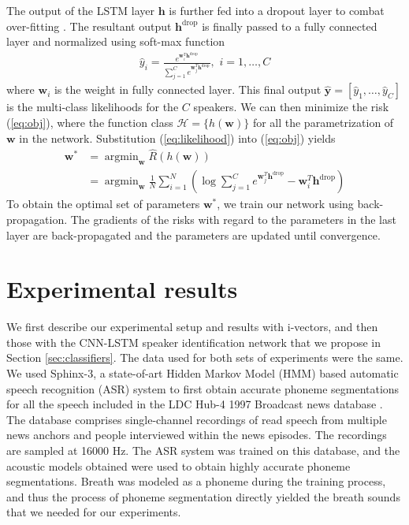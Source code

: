 \documentclass[a4paper]{article}
\DeclareMathOperator*{\argmin}{argmin}
\begin{document}
The output of the LSTM layer $\mathbf{h}$ is further fed into a dropout layer to combat over-fitting \cite{srivastava2014dropout}. The resultant output $\mathbf{h}^{\mathrm{drop}}$ is finally passed to a fully connected layer and normalized using soft-max function
\begin{align}
\widehat{y}_i = \frac{e^{\mathbf{w}_i^T \mathbf{h}^{\mathrm{drop}}}}{\sum_{j=1}^{C}e^{\mathbf{w}_j^T \mathbf{h}^{\mathrm{drop}}}},\,\, i = 1,\ldots,C
\label{eq:likelihood}
\end{align}
where $\mathbf{w}_i$ is the weight in fully connected layer. This final output $\widehat{\mathbf{y}} = \left [\widehat{y}_1, \ldots, \widehat{y}_C \right]$ is the multi-class likelihoods for the $C$ speakers. We can then minimize the risk (\ref{eq:obj}), where the function class $\mathcal{H} = \{h(\mathbf{w})\}$ for all the parametrization of $\mathbf{w}$ in the network. Substitution (\ref{eq:likelihood}) into (\ref{eq:obj}) yields
\begin{align}
\mathbf{w}^* &= \argmin_{\mathbf{w}} \widehat{R}(h(\mathbf{w})) \nonumber \\
&= \argmin_{\mathbf{w}} \tfrac1{N}\sum_{i=1}^{N} (\log \sum_{j=1}^{C}e^{\mathbf{w}_j^T\mathbf{h}^{\mathrm{drop}}} - \mathbf{w}_i^T \mathbf{h}^\mathrm{drop})
\label{eq:net_obj}
\end{align}
To obtain the optimal set of parameters $\mathbf{w}^*$, we train our network using back-propagation. The gradients of the risks with regard to the parameters in the last layer are back-propagated and the parameters are updated until convergence.


\section{Experimental results}
\label{sec:expts}
We first describe our experimental setup and results with i-vectors, and then those with the CNN-LSTM speaker identification network that we propose in Section \ref{sec:classifiers}. The data used for both sets of experiments were the same. We used Sphinx-3, a state-of-art Hidden Markov Model (HMM) based automatic speech recognition (ASR) system to first obtain accurate phoneme segmentations for all the speech included in the LDC Hub-4 1997 Broadcast news database  \cite{hub4-97}. The database comprises single-channel recordings of read speech from multiple news anchors and people interviewed within the news episodes. The recordings are sampled at 16000 Hz. The ASR system was trained on this  database, and the acoustic models obtained were used to obtain highly accurate phoneme segmentations. Breath was modeled as a phoneme during the training process, and thus the process of phoneme segmentation directly yielded the breath sounds that we needed for our experiments. 
\end{document}
